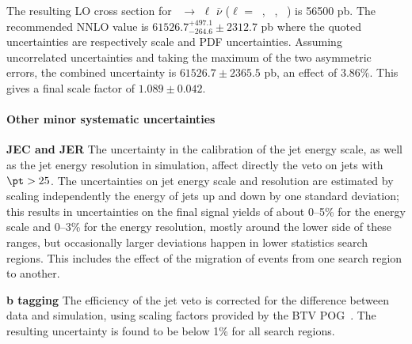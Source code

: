 The resulting LO cross section for \PW\ $\rightarrow$ $\ell$
$\bar{\nu}$ ($\ell$ = \Pe\ , \PGm\ , \PGt\ ) is 56500 pb. The recommended NNLO value is $61526.7^{+497.1}_{-264.6}\pm 2312.7$ pb where the quoted uncertainties are respectively scale and PDF uncertainties. Assuming uncorrelated uncertainties and taking the maximum of the two asymmetric errors, the combined uncertainty is $61526.7 \pm 2365.5$ pb, an effect of $3.86\%$. This gives a final scale factor of $1.089 \pm 0.042$.

\paragraph{Other minor systematic uncertainties}
\textbf{JEC and JER}
The uncertainty in the calibration of the jet energy scale, as well
as the jet energy resolution in simulation, affect directly the veto
on \PQb jets with $\pt>25$\GeV.
The uncertainties on jet energy scale and resolution are estimated by
scaling independently the energy of jets up and down by one standard
deviation; this results in uncertainties on the final signal yields of about
0--5\% for the energy scale and 0--3\% for the energy resolution,
mostly around the lower side of these ranges, but occasionally larger
deviations happen in lower statistics search regions.
This includes the effect of the migration of events from one search
region to another.

\textbf{b tagging}
The efficiency of the \PQb jet veto is corrected for the difference
between data and simulation, using scaling factors provided by the BTV
POG~\cite{BTagCorr}.
The resulting uncertainty is found to
be below 1\% for all search regions.

